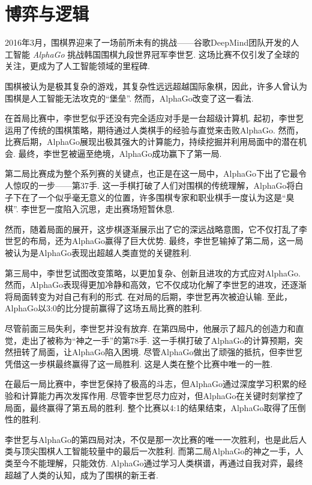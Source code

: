 \chapter{博弈与逻辑}\label{chap:game}

2016年3月，围棋界迎来了一场前所未有的挑战——谷歌DeepMind团队开发的人工智能 \textit{AlphaGo} 挑战韩国围棋九段世界冠军李世乭. 这场比赛不仅引发了全球的关注，更成为了人工智能领域的里程碑. 

围棋被认为是极其复杂的游戏，其复杂性远远超越国际象棋，因此，许多人曾认为围棋是人工智能无法攻克的“堡垒”. 然而，AlphaGo改变了这一看法. 

在首局比赛中，李世乭似乎还没有完全适应对手是一台超级计算机. 起初，李世乭运用了传统的围棋策略，期待通过人类棋手的经验与直觉来击败AlphaGo. 然而，比赛后期，AlphaGo展现出极其强大的计算能力，持续挖掘并利用局面中的潜在机会. 最终，李世乭被逼至绝境，AlphaGo成功赢下了第一局. 

第二局比赛成为整个系列赛的关键点，也正是在这一局中，AlphaGo下出了它最令人惊叹的一步——第37手. 这一手棋打破了人们对围棋的传统理解，AlphaGo将白子下在了一个似乎毫无意义的位置，许多围棋专家和职业棋手一度认为这是“臭棋”. 李世乭一度陷入沉思，走出赛场短暂休息. 

然而，随着局面的展开，这步棋逐渐展示出了它的深远战略意图，它不仅打乱了李世乭的布局，还为AlphaGo赢得了巨大优势. 最终，李世乭输掉了第二局，这一局被认为是AlphaGo表现出超越人类直觉的关键胜利. 

第三局中，李世乭试图改变策略，以更加复杂、创新且进攻的方式应对AlphaGo. 然而，AlphaGo表现得更加冷静和高效，它不仅成功化解了李世乭的进攻，还逐渐将局面转变为对自己有利的形式. 在对局的后期，李世乭再次被迫认输. 至此，AlphaGo以3:0的比分提前赢得了这场五局比赛的胜利. 

尽管前面三局失利，李世乭并没有放弃. 在第四局中，他展示了超凡的创造力和直觉，走出了被称为“神之一手”的第78手. 这一手棋打破了AlphaGo的计算预期，突然扭转了局面，让AlphaGo陷入困境. 尽管AlphaGo做出了顽强的抵抗，但李世乭凭借这一步棋最终赢得了这一局胜利. 这是人类在整个比赛中唯一的一胜. 

在最后一局比赛中，李世乭保持了极高的斗志，但AlphaGo通过深度学习积累的经验和计算能力再次发挥作用. 尽管李世乭尽力应对，但AlphaGo在关键时刻掌控了局面，最终赢得了第五局的胜利. 整个比赛以4:1的结果结束，AlphaGo取得了压倒性的胜利. 

李世乭与AlphaGo的第四局对决，不仅是那一次比赛的唯一一次胜利，也是此后人类与顶尖围棋人工智能较量中的最后一次胜利. 而第二局AlphaGo的神之一手，人类至今不能理解，只能效仿. AlphaGo通过学习人类棋谱，再通过自我对弈，最终超越了人类的认知，成为了围棋的新王者. 

